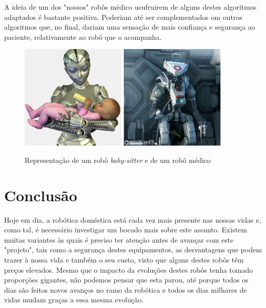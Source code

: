 \documentclass[10pt]{article}
\begin{document}
A ideia de um dos "nossos" robôs médico usufruirem de alguns destes algoritmos adaptados é bastante positiva. Poderiam até ser complementados om outros algoritmos que, no final, dariam uma sensação de mais confiança e segurança ao paciente, relativamente ao robô que o acompanha.

\begin{figure}[h]
\caption{Representação de um robô \textit{baby-sitter} e de um robô médico}
\centering
\includegraphics[width = 5cm]{img/9.2.jpg}
\includegraphics[width = 5cm]{img/9.jpg}
\label{figura:9}
\end{figure}

\newpage

\section{Conclusão}

\hspace{\parindent}Hoje em dia, a robótica doméstica está cada vez mais presente nas nossas vidas e, como tal, é necessário investigar um bocado mais sobre este assunto. Existem muitas variantes às quais é preciso ter atenção antes de avançar com este "projeto", tais como a segurança destes equipamentos, as desvantagens que podem trazer à nossa vida e também o seu custo, visto que alguns destes robôs têm preços elevados. Mesmo que o impacto da evoluções destes robôs tenha tomado proporções gigantes, não podemos pensar que esta parou, até porque todos os dias são feitos novos avanços no ramo da robótica e todos os dias milhares de vidas mudam graças a essa mesma evolução.

\newpage
\printbibliography[title=Referências]
\end{document}
